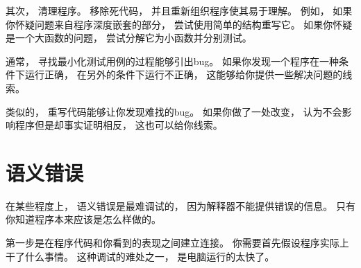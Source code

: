 其次， 清理程序。
移除死代码， 并且重新组织程序使其易于理解。
例如， 如果你怀疑问题来自程序深度嵌套的部分， 尝试使用简单的结构重写它。  如果你怀疑是一个大函数的问题， 尝试分解它为小函数并分别测试。


通常， 寻找最小化测试用例的过程能够引出bug。
如果你发现一个程序在一种条件下运行正确， 在另外的条件下运行不正确， 这能够给你提供一些解决问题的线索。


类似的， 重写代码能够让你发现难找的bug。
如果你做了一处改变， 认为不会影响程序但是却事实证明相反， 这也可以给你线索。


\section{语义错误}


在某些程度上， 语义错误是最难调试的， 因为解释器不能提供错误的信息。  只有你知道程序本来应该是怎么样做的。


第一步是在程序代码和你看到的表现之间建立连接。  你需要首先假设程序实际上干了什么事情。  这种调试的难处之一， 是电脑运行的太快了。


